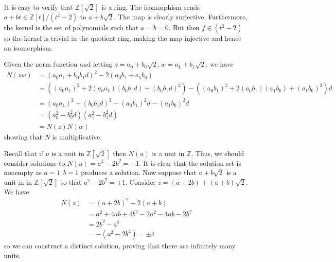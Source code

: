 \documentclass[../../master.tex]{subfiles}
\begin{document}
\begin{solution}
    It is easy to verify that $\mathbb{Z}[\sqrt{2}]$ is a ring.
    The isomorphism sends $a + bt \in \mathbb{Z}[t] / (t^2 - 2)$ to $a + b\sqrt{2}$.
    The map is clearly surjective.
    Furthermore, the kernel is the set of polynomials such that $a = b = 0$.
    But then $f \in (t^2 - 2)$ so the kernel is trivial in the quotient ring, making the map injective and hence an isomorphism.

    Given the norm function and letting $z = a_0 + b_0 \sqrt{2}, w = a_1 + b_1 \sqrt{2}$, we have
    \begin{align*}
        N(zw) &= (a_0 a_1 + b_0 b_1 d)^2 - 2 (a_0 b_1 + a_1 b_0) \\
              &= \left( (a_0 a_1)^2 + 2 (a_0 a_1) (b_0 b_1 d) + (b_0 b_1 d)^2 \right)
              - \left( (a_0 b_1)^2 + 2(a_0 b_1) (a_1 b_0) + (a_1 b_0)^2 \right) d \\
              &= (a_0 a_1)^2 + (b_0 b_1 d)^2 - (a_0 b_1)^2 d - (a_1 b_0)^2 d \\
              &= (a_0^2 - b_0^2 d) (a_1^2 - b_1^2 d) \\
              &= N(z) N(w)
    \end{align*}
    showing that $N$ is multiplicative.

    Recall that if $u$ is a unit in $\mathbb{Z}[\sqrt{2}]$ then $N(u)$ is a unit in $\mathbb{Z}$.
    Thus, we should consider solutions to $N(u) = a^2 - 2b^2 = \pm 1$.
    It is clear that the solution set is nonempty as $a = 1, b = 1$ produces a solution.
    Now suppose that $a + b\sqrt{2}$ is a unit in in $\mathbb{Z}[\sqrt{2}]$ so that $a^2 - 2b^2 = \pm 1$.
    Consider $z = (a + 2b) + (a + b)\sqrt{2}$.
    We have
    \begin{align*}
        N(z) &= (a + 2b)^2 - 2(a + b) \\
             &= a^2 + 4ab + 4b^2 - 2a^2 - 4ab - 2b^2 \\
             &= 2b^2 - a^2 \\
             &= -(a^2 - 2b^2) = \pm 1
    \end{align*}
    so we can construct a distinct solution, proving that there are infinitely many units.


\end{solution}
\end{document}

